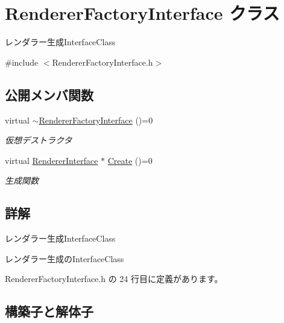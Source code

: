 \hypertarget{class_renderer_factory_interface}{}\section{Renderer\+Factory\+Interface クラス}
\label{class_renderer_factory_interface}


レンダラー生成\+Interface\+Class  




{\ttfamily \#include $<$Renderer\+Factory\+Interface.\+h$>$}

\subsection*{公開メンバ関数}
\begin{DoxyCompactItemize}
\item 
virtual \mbox{\hyperlink{class_renderer_factory_interface_a5be02ce133b5eff567c8a59fedded15b}{$\sim$\+Renderer\+Factory\+Interface}} ()=0
\begin{DoxyCompactList}\small\item\em 仮想デストラクタ \end{DoxyCompactList}\item 
virtual \mbox{\hyperlink{class_renderer_interface}{Renderer\+Interface}} $\ast$ \mbox{\hyperlink{class_renderer_factory_interface_aa81911973b6079fda8489409385d71e3}{Create}} ()=0
\begin{DoxyCompactList}\small\item\em 生成関数 \end{DoxyCompactList}\end{DoxyCompactItemize}


\subsection{詳解}
レンダラー生成\+Interface\+Class 

レンダラー生成の\+Interface\+Class 

 Renderer\+Factory\+Interface.\+h の 24 行目に定義があります。



\subsection{構築子と解体子}
\mbox{\label{class_renderer_factory_interface_a5be02ce133b5eff567c8a59fedded15b}} 
